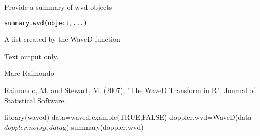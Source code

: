 \documentclass{article}
\begin{document}
\begin{Description}\relax
Provide a summary of wvd objects
\end{Description}
\begin{Usage}
\begin{verbatim}
summary.wvd(object,...)
\end{verbatim}
\end{Usage}
\begin{Arguments}
\begin{ldescription}
\item[\code{object}] A list created by the WaveD function  
\end{ldescription}
\end{Arguments}
\begin{Value}
Text output only.
\end{Value}
\begin{Author}\relax
Marc Raimondo
\end{Author}
\begin{References}\relax
Raimondo, M. and Stewart, M. (2007),
"The WaveD Transform in R", Journal of Statistical Software.
\end{References}
\begin{SeeAlso}\relax
{}
\end{SeeAlso}
\begin{Examples}
\begin{ExampleCode}
library(waved)
data=waved.example(TRUE,FALSE)
doppler.wvd=WaveD(data$doppler.noisy,data$g)
summary(doppler.wvd)
\end{ExampleCode}
\end{Examples}
\end{document}
